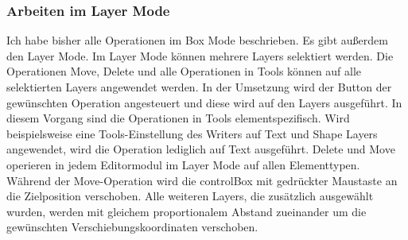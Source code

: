 \subsubsection{Arbeiten im Layer Mode}
Ich habe bisher alle Operationen im Box Mode beschrieben. Es gibt außerdem den Layer Mode. Im Layer Mode können mehrere Layers selektiert werden. Die Operationen Move, Delete und alle Operationen in Tools können auf alle selektierten Layers angewendet werden. In der Umsetzung wird der Button der gewünschten Operation angesteuert und diese wird auf den Layers ausgeführt. In diesem Vorgang sind die Operationen in Tools elementspezifisch. Wird beispielsweise eine Tools-Einstellung des Writers auf Text und Shape Layers angewendet, wird die Operation lediglich auf Text ausgeführt. Delete und Move operieren in jedem Editormodul im Layer Mode auf allen Elementtypen. Während der Move-Operation wird die controlBox mit gedrückter Maustaste an die Zielposition verschoben. Alle weiteren Layers, die zusätzlich ausgewählt wurden, werden mit gleichem proportionalem Abstand zueinander um die gewünschten Verschiebungskoordinaten verschoben. 